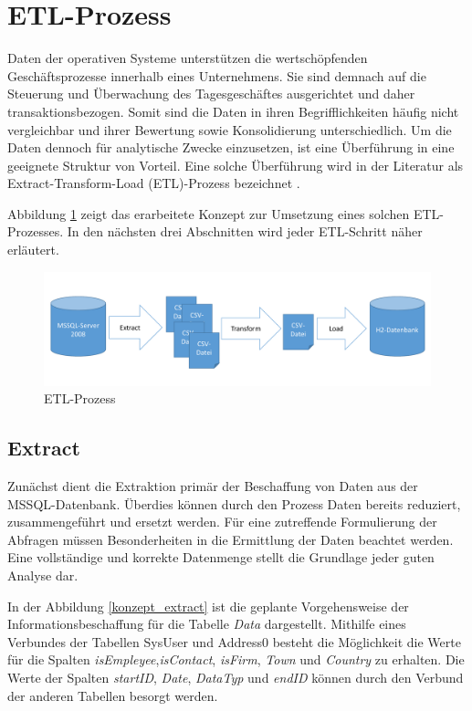 \section{ETL-Prozess}
\label{ch:konzeption:etl}

Daten der operativen Systeme unterstützen die wertschöpfenden Geschäftsprozesse innerhalb eines Unternehmens. Sie sind demnach auf die Steuerung und Überwachung des Tagesgeschäftes ausgerichtet und daher transaktionsbezogen. Somit sind die Daten in ihren Begrifflichkeiten häufig nicht vergleichbar und ihrer Bewertung sowie Konsolidierung unterschiedlich. Um die Daten dennoch für analytische Zwecke einzusetzen, ist eine Überführung in eine geeignete Struktur von Vorteil. Eine solche Überführung wird in der Literatur als Extract-Transform-Load (ETL)-Prozess bezeichnet \cite{ElSappagh201191}. 

Abbildung \ref{konzept:etl} zeigt das erarbeitete Konzept zur Umsetzung eines solchen ETL-Prozesses. In den nächsten drei Abschnitten wird jeder ETL-Schritt näher erläutert.

\begin{figure}[htbp]
\centering
  \includegraphics[width=1.0\textwidth, width=1.0\textwidth]{pics/ETL.pdf}
\caption{ETL-Prozess}
\label{konzept:etl}
\end{figure} 


\subsection{Extract}

Zunächst dient die Extraktion primär der Beschaffung von Daten aus der MSSQL-Datenbank. Überdies können durch den Prozess Daten bereits reduziert,  zusammengeführt und ersetzt werden. Für eine zutreffende Formulierung der Abfragen müssen Besonderheiten in die Ermittlung der Daten beachtet werden. Eine vollständige und korrekte Datenmenge stellt die Grundlage jeder guten Analyse dar.

In der Abbildung \ref{konzept_extract} ist die geplante Vorgehensweise der Informationsbeschaffung für die Tabelle \textit{Data} dargestellt. Mithilfe eines Verbundes der Tabellen SysUser und Address0 besteht die Möglichkeit die Werte für die Spalten \textit{isEmpleyee},\textit{isContact}, \textit{isFirm}, \textit{Town} und \textit{Country} zu erhalten. Die Werte der Spalten \textit{startID}, \textit{Date}, \textit{DataTyp} und \textit{endID} können durch den Verbund der anderen Tabellen besorgt werden.

